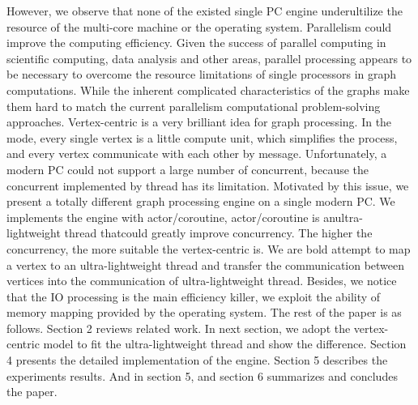 \documentclass[twocolumn,a4paper,10pt]{article}
\begin{document}
\newline
However, we observe that none of the existed single PC engine underultilize the resource of the multi-core machine or the operating system. Parallelism could improve the computing efficiency. Given the success of parallel computing in scientific computing, data analysis and other areas, parallel processing appears to be necessary to overcome the resource limitations of single processors in graph computations. While the inherent complicated characteristics of the graphs make them hard to match the current parallelism computational problem-solving approaches. Vertex-centric is a very brilliant idea for graph processing. In the mode, every single vertex is a little compute unit, which simplifies the process, and every vertex communicate with each other by message. Unfortunately, a modern PC could not support a large number of concurrent, because the concurrent implemented by thread has its limitation. Motivated by this issue, we present a totally different graph processing engine on a single modern PC. We implements the engine with actor/coroutine, actor/coroutine is anultra-lightweight thread thatcould greatly improve concurrency. The higher the concurrency, the more suitable the vertex-centric is. We are bold attempt to map a vertex to an ultra-lightweight thread and transfer the communication between vertices into the communication of ultra-lightweight thread. Besides, we notice that the IO processing is the main efficiency killer, we exploit the ability of memory mapping provided by the operating system.
\newline
The rest of the paper is as follows. Section 2 reviews related work. In next section, we adopt the vertex-centric model to fit the ultra-lightweight thread and show the difference. Section 4 presents the detailed implementation of the engine. Section 5 describes the experiments results. And in section 5, and section 6 summarizes and concludes the paper.
\end{document}
